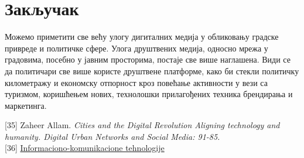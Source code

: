 \documentclass{article}
\begin{document}
\section{Закључак}
Можемо приметити све већу улогу дигиталних медија у
обликовању градске привреде и политичке сфере. Улога друштвених медија, односно мрежа у градовима, посебно у јавним просторима, постаје све више наглашена. Види се да политичари све више користе друштвене платформе, како би стекли политичку километражу и економску отпорност кроз повећање активности у вези са туризмом, коришћењем нових, технолошки прилагођених техника брендирања и маркетинга.

\newpage

 

\vspace{-7}
\bibitem{} [35] Zaheer Allam. \emph{Cities and the  Digital  Revolution Aligning technology and humanity. Digital Urban Networks and Social Media: 91-85.} \\

\vspace{-10}
\bibitem{} [36] \href{http://miticmirjana.weebly.com/104810501058-10901077109310851086108310861075108011121077.html}{Informaciono-komunikacione tehnologije}
\end{document}
